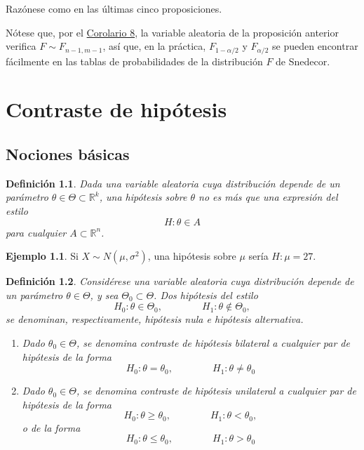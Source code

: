 \documentclass[11pt]{report}
\makeatletter
\renewenvironment{proof}[1][\proofname]{\par
  \pushQED{\qed}%
  \normalfont \topsep\z@skip %
  \trivlist
  \item[\hskip\labelsep
        \itshape
    #1\@addpunct{.}]\ignorespaces
}{%
  \popQED\endtrivlist\@endpefalse
}
\newtheorem{definition}{Definición}
\theoremstyle{definition}
\newtheorem{example}{Ejemplo}
\newcommand{\R}{\mathbb R}
\makeatother
\begin{document}
\begin{proof}
Razónese como en las últimas cinco proposiciones.
\end{proof}

Nótese que, por el \hyperref[cor8]{\color{blue}Corolario 8}, la variable aleatoria de la proposición anterior verifica $F \sim F_{n-1,m-1}$, así que, en la práctica, $F_{1-\alpha/2}$ y $F_{\alpha/2}$ se pueden encontrar fácilmente en las tablas de probabilidades de la distribución $F$ de Snedecor.

\chapter{Contraste de hipótesis}

\section{Nociones básicas}

\begin{definition}
    Dada una variable aleatoria cuya distribución depende de un parámetro $\theta \in \Theta \subset \R^k$, una \emph{hipótesis sobre $\theta$} no es más que una expresión del estilo \[H \colon \theta \in A\] para cualquier $A \subset \R^n$.
\end{definition}

\begin{example}
    Si $X \sim N(\mu,\sigma^2)$, una hipótesis sobre $\mu$ sería $H \colon \mu = 27$.
\end{example}

\begin{definition}
    Considérese una variable aleatoria cuya distribución depende de un parámetro $\theta \in \Theta$, y sea $\Theta_0 \subset \Theta$. Dos hipótesis del estilo \[H_0 \colon \theta \in \Theta_0, \qquad \qquad H_1 \colon \theta \not\in \Theta_0,\] se denominan, respectivamente, \emph{hipótesis nula} e \emph{hipótesis alternativa}.
    \begin{enumerate}
        \item Dado $\theta_0 \in \Theta$, se denomina \emph{contraste de hipótesis bilateral} a cualquier par de hipótesis de la forma
            \[H_0 \colon \theta = \theta_0, \qquad \qquad H_1 \colon \theta \neq \theta_0\]
        \item Dado $\theta_0 \in \Theta$, se denomina \emph{contraste de hipótesis unilateral} a cualquier par de hipótesis de la forma
            \[H_0 \colon \theta \geq \theta_0, \qquad \qquad H_1 \colon \theta < \theta_0,\]
            o de la forma
            \[H_0 \colon \theta \leq \theta_0, \qquad \qquad H_1 \colon \theta > \theta_0\]
    \end{enumerate}
\end{definition}
\end{document}
